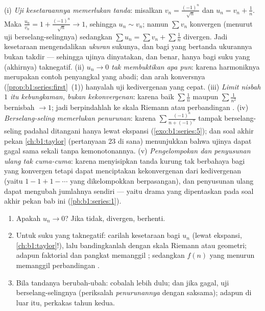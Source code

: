 \begin{remark}
(i) \emph{Uji kesetaraannya memerlukan tanda}: misalkan $v_n =
\frac{(-1)^n}{\sqrt n}$ dan $u_n = v_n + \frac1n$. Maka
$\frac{u_n}{v_n} = 1 + \frac{(-1)^n}{\sqrt n} \to 1$, sehingga $u_n
\sim v_n$; namun $\sum v_n$ konvergen (menurut uji berselang-selingnya) sedangkan
$\sum u_n = \sum v_n + \sum \frac1n$ divergen. Jadi kesetaraan
mengendalikan \emph{ukuran} sukunya, dan bagi  yang bertanda ukurannya
bukan takdir --- sehingga ujinya dinyatakan, dan benar, hanya bagi suku yang
(akhirnya) taknegatif. (ii) \emph{$u_n \to 0$
tak membuktikan apa pun}: karena  harmoniknya merupakan contoh penyangkal
yang abadi; dan arah konversnya
(\cref{prop:b1:series:first}~(1)) hanyalah uji kedivergenan
yang cepat. (iii) \emph{Limit nisbah $1$ itu kebungkaman, bukan
kekonvergenan}: karena baik $\sum\frac1n$ maupun $\sum\frac{1}{n^2}$ bernisbah
$\to 1$; jadi berpindahlah ke skala Riemann atau perbandingan .
(iv) \emph{Berselang-seling memerlukan penurunan}: karena $\sum
\frac{(-1)^n}{n + (-1)^n}$ tampak berselang-seling padahal ditangani
hanya lewat ekspansi (\cref{exo:b1:series:5}); dan soal akhir pekan
\cref{ch:b1:taylor} (pertanyaan 23 di sana) menunjukkan bahwa ujinya dapat
gagal sama sekali tanpa kemonotonannya. (v) \emph{Pengelompokan dan
penyusunan ulang tak cuma-cuma}: karena menyisipkan tanda kurung tak berbahaya bagi
 yang konvergen tetapi dapat menciptakan kekonvergenan dari kedivergenan
(yaitu $1 - 1 + 1 - \cdots$ yang dikelompokkan berpasangan), dan penyusunan ulang dapat
mengubah jumlahnya sendiri --- yaitu drama yang dipentaskan pada
soal akhir pekan bab ini (\cref{pb:b1:series:1}).
\end{remark}

\begin{method}\label{met:b1:series:decide}
\begin{enumerate}
  \item Apakah $u_n \to 0$? Jika tidak, divergen, berhenti.
  \item Untuk suku yang taknegatif: carilah kesetaraan bagi $u_n$ (lewat ekspansi,
        \cref{ch:b1:taylor}!), lalu bandingkanlah dengan skala Riemann atau
        geometri; adapun faktorial dan pangkat memanggil ;
        sedangkan $f(n)$ yang menurun memanggil perbandingan .
  \item Bila tandanya berubah-ubah: cobalah  lebih dulu; dan jika gagal,
        uji berselang-selingnya (periksalah \emph{penurunannya} dengan saksama); adapun di luar
        itu, perkakas tahun kedua.
\end{enumerate}
\end{method}


